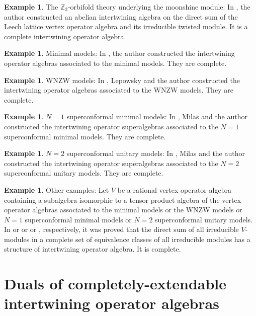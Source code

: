 \documentclass{amsproc}
\theoremstyle{definition}
\newtheorem{expl}[thm]{Example}
\theoremstyle{remark}
\numberwithin{equation}{section}
\begin{document}
\begin{expl}
{\rm The $\mathbb{Z}_{2}$-orbifold theory underlying the moonshine
module: In \cite{H2}, the author constructed an abelian intertwining 
algebra on the direct sum of the Leech lattice vertex operator algebra
and its irreducible twisted module. It is a complete intertwining
operator algebra.}
\end{expl}

\begin{expl}
{\rm Minimal models: In \cite{H3}, the author constructed the
intertwining operator algebras
associated to the minimal models. They are complete.}
\end{expl}

\begin{expl}
{\rm WNZW models: In \cite{HL5}, Lepowsky and the author constructed the
intertwining operator algebras associated to the WNZW models. They are 
complete.}
\end{expl}

\begin{expl}
{\rm $N=1$ superconformal minimal models: In \cite{HM1},
Milas and the author constructed the intertwining operator superalgebras
associated to the $N=1$ superconformal minimal models. They are complete.}
\end{expl}

\begin{expl}
{\rm $N=2$ superconformal unitary models: In \cite{HM2},
Milas and the author constructed the intertwining operator superalgebras
associated to the $N=2$ superconformal unitary models. They are complete.}
\end{expl}

\begin{expl}
{\rm Other examples: 
Let $V$ be a rational vertex operator algebra
containing a subalgebra isomorphic to a tensor product algebra
of the vertex operator algebras associated to the minimal models
or the WNZW models or $N=1$ superconformal minimal models or
$N=2$ superconformal unitary models. In \cite{H3} or \cite{HL5} or \cite{HM1} 
or \cite{HM2}, respectively, it was proved that the direct sum of all 
irreducible 
$V$-modules in a complete set of equivalence classes of all 
irreducible modules has a structure of intertwining operator algebra.
It is complete.}
\end{expl}


\section{Duals of completely-extendable intertwining operator algebras}
\end{document}
